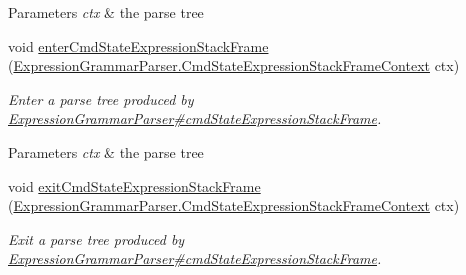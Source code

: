 \begin{DoxyCompactItemize}
\begin{DoxyCompactList}
\begin{DoxyParams}{Parameters}
{\em ctx} & the parse tree\\
\hline
\end{DoxyParams}
 \end{DoxyCompactList}\item 
void \hyperlink{classgov_1_1nasa_1_1jpf_1_1inspector_1_1server_1_1expression_1_1parser_1_1_expression_grammar_base_listener_a4c7e2a45bd414e0d32728da44126250c}{enter\+Cmd\+State\+Expression\+Stack\+Frame} (\hyperlink{classgov_1_1nasa_1_1jpf_1_1inspector_1_1server_1_1expression_1_1parser_1_1_expression_grammar_pa1661807291671005dea18d81e1943036}{Expression\+Grammar\+Parser.\+Cmd\+State\+Expression\+Stack\+Frame\+Context} ctx)
\begin{DoxyCompactList}\small\item\em Enter a parse tree produced by \hyperlink{classgov_1_1nasa_1_1jpf_1_1inspector_1_1server_1_1expression_1_1parser_1_1_expression_grammar_parser_a5e0feabb2511339d22851a433e2a7e19}{Expression\+Grammar\+Parser\#cmd\+State\+Expression\+Stack\+Frame}.


\begin{DoxyParams}{Parameters}
{\em ctx} & the parse tree\\
\hline
\end{DoxyParams}
 \end{DoxyCompactList}\item 
void \hyperlink{classgov_1_1nasa_1_1jpf_1_1inspector_1_1server_1_1expression_1_1parser_1_1_expression_grammar_base_listener_a4da9aac59fda40751d784257115f176a}{exit\+Cmd\+State\+Expression\+Stack\+Frame} (\hyperlink{classgov_1_1nasa_1_1jpf_1_1inspector_1_1server_1_1expression_1_1parser_1_1_expression_grammar_pa1661807291671005dea18d81e1943036}{Expression\+Grammar\+Parser.\+Cmd\+State\+Expression\+Stack\+Frame\+Context} ctx)
\begin{DoxyCompactList}\small\item\em Exit a parse tree produced by \hyperlink{classgov_1_1nasa_1_1jpf_1_1inspector_1_1server_1_1expression_1_1parser_1_1_expression_grammar_parser_a5e0feabb2511339d22851a433e2a7e19}{Expression\+Grammar\+Parser\#cmd\+State\+Expression\+Stack\+Frame}.



\end{DoxyCompactList}
\end{DoxyCompactItemize}
